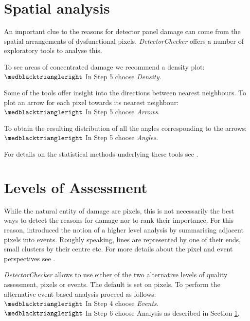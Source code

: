 \documentclass[11pt,a4paper,twosided]{article}
\newcommand{\DetectorChecker}{\emph{DetectorChecker}\xspace}
\begin{document}
\section{Spatial analysis}\label{spatial}

An important clue to the reasons for detector panel damage can come from the spatial arrangements
of dysfunctional pixels. \DetectorChecker offers a number of exploratory tools to analyse this.

To see areas of concentrated damage we recommend a density plot:\\
$\medblacktriangleright$ In Step 5 choose {\it Density}.

Some of the tools offer insight into the directions between nearest neighbours.
To plot an arrow for each pixel towards its nearest neighbour:\\
$\medblacktriangleright$ In Step 5 choose {\it Arrows}.

To obtain the resulting distribution of all the angles corresponding to the arrows:\\ 
$\medblacktriangleright$ In Step 5 choose {\it Angles}.

For details on the statistical methods underlying these tools see \cite{brettschneider2017crism}.


\section{Levels of Assessment}\label{levels}

While the natural entity of damage are pixels, this is not necessarily the best ways to detect the reasons 
for damage nor to rank their importance. For this reason, \cite{brettschneider2017crism} introduced 
the notion of a higher level analysis by summarising adjacent pixels into events. Roughly speaking, lines are represented by one of their ends, small clusters by their centre etc. For more details about the pixel and event perspectives see \cite{brettschneider2017crism}.

\DetectorChecker allows to use either of the two alternative levels of quality assessment, pixels or events.
The default is set on pixels. To perform the alternative event based analysis proceed as follows:\\
$\medblacktriangleright$ In Step 4 choose {\it Events.}\\
$\medblacktriangleright$ In Step 6 choose Analysis as described in Section \ref{spatial}.
\end{document}
